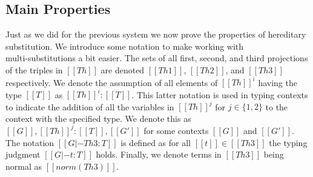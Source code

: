 \subsection{Main Properties}
\label{subsec:properties_of_the_hereditary_substitution_function}
Just as we did for the previous system we now prove the properties of
hereditary substitution.  We introduce some notation to make working
with \\ multi-substitutions a bit easier.  The sets of all first, second,
and third projections of the triples in $[[Th]]$ are denoted $[[Th
1]]$, $[[Th 2]]$, and $[[Th 3]]$ respectively.  We denote the
assumption of all elements of $[[Th]]^i$ having the type $[[T]]$ as
$[[Th]]^i : [[T]]$. This latter notation is used in typing contexts to
indicate the addition of all the variables in $[[Th]]^j$ for $j \in
\{1,2\}$ to the context with the specified type.  We denote this as
$[[G]],[[Th]]^j : [[T]],[[G']]$ for some contexts $[[G]]$ and
$[[G']]$.  The notation $[[G |- Th 3 : T]]$ is defined as for all
$[[t]] \in [[Th 3]]$ the typing judgment $[[G |- t : T]]$ holds.
Finally, we denote terms in $[[Th 3]]$ being normal as $[[norm(Th
3)]]$.

